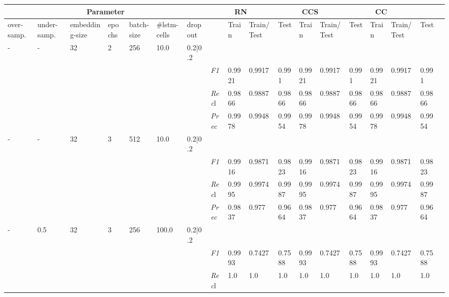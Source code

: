     \begin{table}[]
    \tiny
    \tabcolsep=0.11cm
    \begin{tabularx}{\textwidth}{XXXXXXX|X|XXX|XXX|XXXX}
    \toprule
    \multicolumn{7}{c}{Parameter} & \multicolumn{3}{c}{RN} & \multicolumn{3}{c}{CCS} & \multicolumn{3}{c}{CC} \\ \midrule
    over-\newline samp. & under-\newline samp. & embedding-\newline size & epochs &batch-\newline size & \#lstm-\newline cells & dropout & & Train & Train/\newline Test & Test & Train & Train/\newline Test & Test & Train & Train/\newline Test & Test \\ \midrule
    - & - & 32 & 2 & 256 &10.0 & 0.2|0.2 & & & & & & & & & \\
    & & & & & & & \textit{F1} & 0.9921 & 0.9917 & 0.991 & 0.9921 & 0.9917        & 0.991        & 0.9921        & 0.9917        & 0.991        \\
    & & & & & & & \textit{Rec}l & 0.9866 & 0.9887 & 0.9866    & 0.9866 & 0.9887    & 0.9866    & 0.9866    & 0.9887    & 0.9866    \\
    & & & & & & & \textit{Prec} & 0.9978 & 0.9948 & 0.9954 & 0.9978 & 0.9948 & 0.9954 & 0.9978 & 0.9948 & 0.9954 \\ \midrule
    - & - & 32 & 3 & 512 &10.0 & 0.2|0.2 & & & & & & & & & \\
    & & & & & & & \textit{F1} & 0.9916 & 0.9871 & 0.9823 & 0.9916 & 0.9871        & 0.9823        & 0.9916        & 0.9871        & 0.9823        \\
    & & & & & & & \textit{Rec}l & 0.9995 & 0.9974 & 0.9987    & 0.9995 & 0.9974    & 0.9987    & 0.9995    & 0.9974    & 0.9987    \\
    & & & & & & & \textit{Prec} & 0.9837 & 0.977 & 0.9664 & 0.9837 & 0.977 & 0.9664 & 0.9837 & 0.977 & 0.9664 \\ \midrule
    - & 0.5 & 32 & 3 & 256 &100.0 & 0.2|0.2 & & & & & & & & & \\
    & & & & & & & \textit{F1} & 0.9993 & 0.7427 & 0.7588 & 0.9993 & 0.7427        & 0.7588        & 0.9993        & 0.7427        & 0.7588        \\
    & & & & & & & \textit{Rec}l & 1.0 & 1.0 & 1.0    & 1.0 & 1.0    & 1.0    & 1.0    & 1.0    & 1.0    \\

\end{tabularx}
\end{table}
